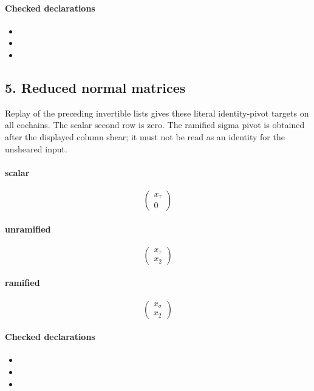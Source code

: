 \paragraph{Checked declarations}
\begin{itemize}
\item {}
\item {}
\item {}
\end{itemize}

\subsection*{5. Reduced normal matrices}
Replay of the preceding invertible lists gives these literal identity-pivot targets on all cochains. The scalar second row is zero. The ramified sigma pivot is obtained after the displayed column shear; it must not be read as an identity for the unsheared input.

\paragraph{scalar}
\[\begin{pmatrix}x_{\tau}\\0\end{pmatrix}\]
\paragraph{unramified}
\[\begin{pmatrix}x_{\tau}\\x_{2}\end{pmatrix}\]
\paragraph{ramified}
\[\begin{pmatrix}x_{\sigma}\\x_{2}\end{pmatrix}\]
\paragraph{Checked declarations}
\begin{itemize}
\item {}
\item {}
\item {}
\end{itemize}

